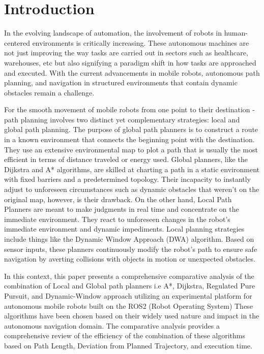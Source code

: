 \documentclass[sigconf]{acmart}
\begin{document}
\maketitle

\section{Introduction}
In the evolving landscape of automation, the involvement of robots in human-centered environments is critically increasing. These autonomous machines are not just improving the way tasks are carried out in sectors such as healthcare, warehouses, etc but also signifying a paradigm shift in how tasks are approached and executed. With the current advancements in mobile robots, autonomous path planning, and navigation in structured environments that contain dynamic obstacles remain a challenge.

For the smooth movement of mobile robots from one point to their destination - path planning involves two distinct yet complementary strategies: local and global path planning.
The purpose of global path planners is to construct a route in a known environment that connects the beginning point with the destination. They use an extensive environmental map to plot a path that is usually the most efficient in terms of distance traveled or energy used. Global planners, like the Dijkstra and A* algorithms, are skilled at charting a path in a static environment with fixed barriers and a predetermined topology. Their incapacity to instantly adjust to unforeseen circumstances such as dynamic obstacles that weren't on the original map, however, is their drawback.
On the other hand, Local Path Planners are meant to make judgments in real time and concentrate on the immediate environment. They react to unforeseen changes in the robot's immediate environment and dynamic impediments. Local planning strategies include things like the Dynamic Window Approach (DWA) algorithm. Based on sensor inputs, these planners continuously modify the robot's path to ensure safe navigation by averting collisions with objects in motion or unexpected obstacles.

In this context, this paper presents a comprehensive comparative analysis of the combination of Local and Global path planners i.e A*, Dijkstra, Regulated Pure Pursuit, and Dynamic-Window approach utilizing an experimental platform for autonomous mobile robots built on the ROS2 (Robot Operating System) These algorithms have been chosen based on their widely used nature and impact in the autonomous navigation domain. The comparative analysis provides a comprehensive review of the efficiency of the combination of these algorithms based on Path Length, Deviation from Planned Trajectory, and execution time.
\end{document}
